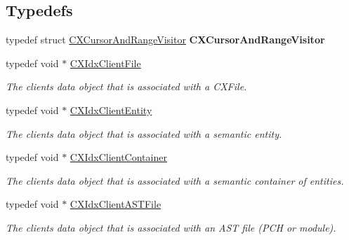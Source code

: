\subsection*{Typedefs}
\begin{DoxyCompactItemize}
\item 
\mbox{\label{group__CINDEX__HIGH_ga72188fec58b54e655adf195c93118162}} 
typedef struct \hyperlink{structCXCursorAndRangeVisitor}{C\+X\+Cursor\+And\+Range\+Visitor} {\bfseries C\+X\+Cursor\+And\+Range\+Visitor}
\item 
\mbox{\label{group__CINDEX__HIGH_ga6fd9c59c0b0a0a21622e5bcfc08156cc}} 
typedef void $\ast$ \hyperlink{group__CINDEX__HIGH_ga6fd9c59c0b0a0a21622e5bcfc08156cc}{C\+X\+Idx\+Client\+File}
\begin{DoxyCompactList}\small\item\em The client\textquotesingle{}s data object that is associated with a C\+X\+File. \end{DoxyCompactList}\item 
\mbox{\label{group__CINDEX__HIGH_gaaa7374e63b63b3d14af7cf87af386955}} 
typedef void $\ast$ \hyperlink{group__CINDEX__HIGH_gaaa7374e63b63b3d14af7cf87af386955}{C\+X\+Idx\+Client\+Entity}
\begin{DoxyCompactList}\small\item\em The client\textquotesingle{}s data object that is associated with a semantic entity. \end{DoxyCompactList}\item 
\mbox{\label{group__CINDEX__HIGH_ga0dac2cb977094bbd9d13b9d8abed278f}} 
typedef void $\ast$ \hyperlink{group__CINDEX__HIGH_ga0dac2cb977094bbd9d13b9d8abed278f}{C\+X\+Idx\+Client\+Container}
\begin{DoxyCompactList}\small\item\em The client\textquotesingle{}s data object that is associated with a semantic container of entities. \end{DoxyCompactList}\item 
\mbox{\label{group__CINDEX__HIGH_ga802a69b3db636a25c5d434585fce9cbd}} 
typedef void $\ast$ \hyperlink{group__CINDEX__HIGH_ga802a69b3db636a25c5d434585fce9cbd}{C\+X\+Idx\+Client\+A\+S\+T\+File}
\begin{DoxyCompactList}\small\item\em The client\textquotesingle{}s data object that is associated with an A\+ST file (P\+CH or module). \end{DoxyCompactList}\item 

\end{DoxyCompactItemize}
